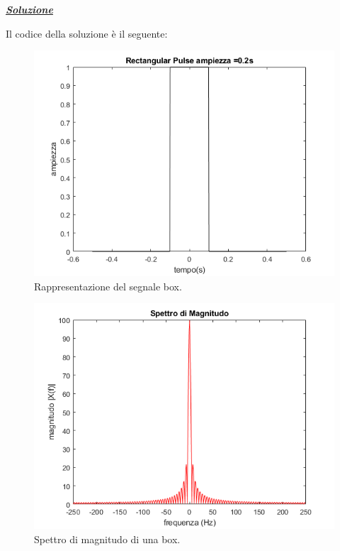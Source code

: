 \documentclass[a4paper]{article}
\begin{document}
	\noindent
	\textcolor{Green4}{\textbf{\emph{\underline{Soluzione}}}}\newline
	
	\noindent
	Il codice della soluzione è il seguente:
	\newpage
	
	\begin{figure}[!htp]
		\centering
		\includegraphics[width=.9\textwidth]{img/lab/lab5-2.png}
		\caption{Rappresentazione del segnale box.}
	\end{figure}
	\begin{figure}[!htp]
		\centering
		\includegraphics[width=.9\textwidth]{img/lab/lab5-3.png}
		\caption{Spettro di magnitudo di una box.}
	\end{figure}\newpage
	
\end{document}
